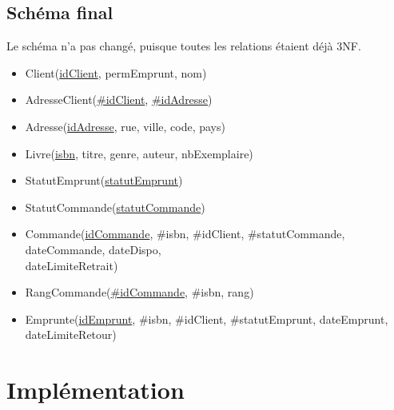 \documentclass{article}
\begin{document}
\subsection{Schéma final}
Le schéma n'a pas changé, puisque toutes les relations étaient déjà 3NF.
\begin{itemize}[label=$\bullet$]
\item Client(\underline{idClient}, permEmprunt, nom)
\item AdresseClient(\underline{\#idClient}, \underline{\#idAdresse})
\item Adresse(\underline{idAdresse}, rue, ville, code, pays)
\item Livre(\underline{isbn}, titre, genre, auteur, nbExemplaire)
\item StatutEmprunt(\underline{statutEmprunt})
\item StatutCommande(\underline{statutCommande})
\item Commande(\underline{idCommande}, \#isbn, \#idClient, \#statutCommande,
  dateCommande, dateDispo, \\
  dateLimiteRetrait)
\item RangCommande(\underline{\#idCommande}, \#isbn, rang)
\item Emprunte(\underline{idEmprunt}, \#isbn, \#idClient, \#statutEmprunt,
  dateEmprunt, dateLimiteRetour)
\end{itemize}

\section{Implémentation}
\end{document}
